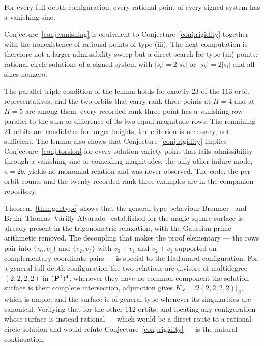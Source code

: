 \begin{conjecture}\label{conj:vanishing}
For every full-depth configuration, every rational point of every signed system has a vanishing sine.
\end{conjecture}
Conjecture~\ref{conj:vanishing} is equivalent to Conjecture~\ref{conj:rigidity} together with the nonexistence of rational points of type (iii). The next computation is therefore not a larger admissibility sweep but a direct search for type (iii) points: rational-circle solutions of a signed system with $|s_l|=2|s_k|$ or $|s_k|=2|s_l|$ and all sines nonzero.

The parallel-triple condition of the lemma holds for exactly $23$ of the $113$ orbit representatives, and the two orbits that carry rank-three points at $H=4$ and at $H=5$ are among them; every recorded rank-three point has a vanishing row parallel to the sum or difference of its two equal-magnitude rows. The remaining $21$ orbits are candidates for larger heights; the criterion is necessary, not sufficient. The lemma also shows that Conjecture~\ref{conj:rigidity} implies Conjecture~\ref{conj:torsion} for every solution-variety point that fails admissibility through a vanishing sine or coinciding magnitudes; the only other failure mode, $a=2b$, yields no monomial relation and was never observed. The code, the per-orbit counts and the twenty recorded rank-three examples are in the companion repository.

Theorem~\ref{thm:gentype} shows that the general-type behaviour Bremner~\cite{Bremner2001} and
Bruin--Thomas--V\'arilly-Alvarado~\cite{BTV} established for the magic-square surface is already present in the trigonometric
relaxation, with the Gaussian-prime arithmetic removed. The decoupling that makes the proof elementary — the rows pair into
$\{v_0,v_1\}$ and $\{v_2,v_3\}$ with $v_0\pm v_1$ and $v_2\pm v_3$ supported on complementary coordinate pairs — is special
to the Hadamard configuration. For a general full-depth configuration the two relations are divisors of multidegree $(2,2,2,2)$ in $(\mathbf P^1)^4$; whenever
they have no common component the solution surface is their complete intersection, adjunction gives
$K_S=\mathcal O(2,2,2,2)|_S$, which is ample, and the surface is of general type whenever its singularities are canonical. Verifying that for the other $112$ orbits, and
locating any configuration whose surface is instead rational — which would be a direct route to a rational-circle solution
and would refute Conjecture~\ref{conj:rigidity} — is the natural continuation.
